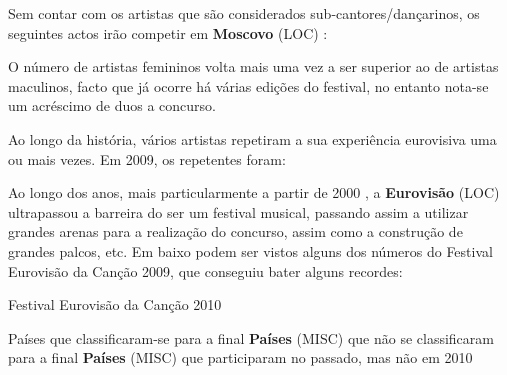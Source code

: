 \documentclass[12pt,a4paper]{article}
\begin{document}
Sem contar com os artistas que são considerados sub-cantores/dançarinos, os seguintes actos irão competir em \textbf{Moscovo} (LOC) :

O número de artistas femininos volta mais uma vez a ser superior ao de artistas maculinos, facto que já ocorre há várias edições do festival, no entanto nota-se um acréscimo de duos a concurso.

Ao longo da história, vários artistas repetiram a sua experiência eurovisiva uma ou mais vezes. Em 2009, os repetentes foram:

Ao longo dos anos, mais particularmente a partir de 2000 , a \textbf{Eurovisão} (LOC) ultrapassou a barreira do ser um festival musical, passando assim a utilizar grandes arenas para a realização do concurso, assim como a construção de grandes palcos, etc. Em baixo podem ser vistos alguns dos números do Festival Eurovisão da Canção 2009, que conseguiu bater alguns recordes:



Festival Eurovisão da Canção 2010



Países que classificaram-se para a final \textbf{Países} (MISC) que não se classificaram para a final \textbf{Países} (MISC) que participaram no passado, mas não em 2010
\end{document}
